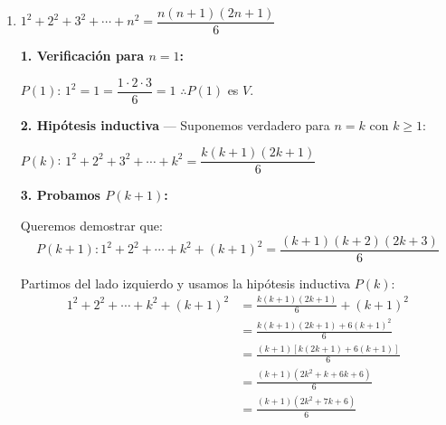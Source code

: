 \documentclass[12pt]{article}
\begin{document}
\begin{enumerate}[label=\alph*.-]
    Partimos del lado izquierdo y usamos la hipótesis inductiva $P(k)$:
    \begin{align*}
        1^2 + 3^2 + \cdots + (2k-1)^2 + (2k+1)^2 &= \frac{k(2k-1)(2k+1)}{3} + (2k+1)^2 \\
        &= \frac{k(2k-1)(2k+1) + 3(2k+1)^2}{3} \\
        &= \frac{(2k+1)\left[k(2k-1) + 3(2k+1)\right]}{3} \\
        &= \frac{(2k+1)(2k^2 - k + 6k + 3)}{3} \\
        &= \frac{(2k+1)(2k^2 + 5k + 3)}{3}
    \end{align*}

    Factorizamos $2k^2 + 5k + 3$ usando la fórmula cuadrática:
    \[k_{1,2} = \frac{-5 \pm \sqrt{25 - 24}}{4} = \frac{-5 \pm 1}{4} \quad \therefore k_1 = -1, \quad k_2 = -\frac{3}{2}\]

    $\therefore 2k^2 + 5k + 3 = 2(k+1)\left(k + \frac{3}{2}\right) = (k+1)(2k+3)$

    Sustituyendo:
    \[\frac{(2k+1)(k+1)(2k+3)}{3} = \frac{(k+1)(2k+1)(2k+3)}{3}\]

    Que es exactamente el lado derecho de $P(k+1)$. $\therefore P(k+1)$ es $V$, y la proposición queda demostrada para todo $n \geq 1$.

    \item $1^2 + 2^2 + 3^2 + \cdots + n^2 = \dfrac{n(n+1)(2n+1)}{6}$

    \textbf{1. Verificación para $n = 1$:}

    $P(1)$: $1^2 = 1 = \dfrac{1 \cdot 2 \cdot 3}{6} = 1$ \quad $\therefore P(1)$ es $V$.

    \textbf{2. Hipótesis inductiva} — Suponemos verdadero para $n = k$ con $k \geq 1$:

    $P(k)$: $1^2 + 2^2 + 3^2 + \cdots + k^2 = \dfrac{k(k+1)(2k+1)}{6}$

    \textbf{3. Probamos $P(k+1)$:}

    Queremos demostrar que:
    \[P(k+1): 1^2 + 2^2 + \cdots + k^2 + (k+1)^2 = \frac{(k+1)(k+2)(2k+3)}{6}\]

    Partimos del lado izquierdo y usamos la hipótesis inductiva $P(k)$:
    \begin{align*}
        1^2 + 2^2 + \cdots + k^2 + (k+1)^2 &= \frac{k(k+1)(2k+1)}{6} + (k+1)^2 \\
        &= \frac{k(k+1)(2k+1) + 6(k+1)^2}{6} \\
        &= \frac{(k+1)\left[k(2k+1) + 6(k+1)\right]}{6} \\
        &= \frac{(k+1)(2k^2 + k + 6k + 6)}{6} \\
        &= \frac{(k+1)(2k^2 + 7k + 6)}{6}
    \end{align*}


\end{enumerate}
\end{document}

